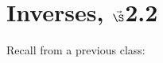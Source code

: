 


%


%

\section{{Inverses, $\vec\S$2.2}}%
% 

%
\thispagestyle{fancy}

Recall from a previous class:

